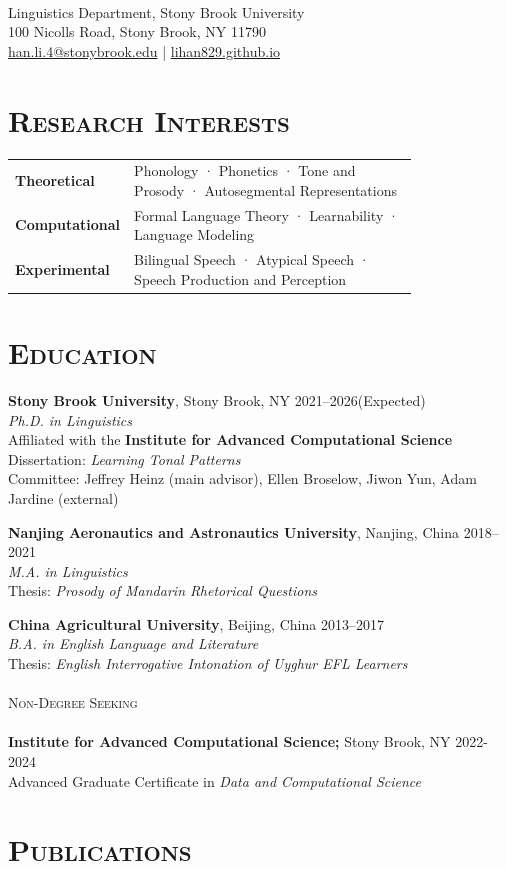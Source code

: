 \documentclass[a4paper,11pt]{article}
\newcommand{\cvsection}[1]{\section*{\Large \textsc{#1}}\vspace{-1em}}
\begin{document}
\begin{center}
    {\LARGE \textbf{}} \\[8pt] %
    Linguistics Department, Stony Brook University \\  
    100 Nicolls Road, Stony Brook, NY 11790 \\  
    \href{mailto:han.li.4@stonybrook.edu}{han.li.4@stonybrook.edu} |
    \href{http://lihan829.github.io}{lihan829.github.io}\\
\end{center}

\cvsection{Research Interests}

\begin{tabular}{@{}l p{0.8\linewidth}@{}}

\textbf{Theoretical} 
& Phonology · Phonetics · Tone and Prosody · Autosegmental Representations \\

\textbf{Computational} 
& Formal Language Theory · Learnability · Language Modeling \\

\textbf{Experimental} 
& Bilingual Speech · Atypical Speech · Speech Production and Perception \\


\end{tabular}

\cvsection{Education}
\noindent
\textbf{Stony Brook University}, Stony Brook, NY \hfill 2021–2026(Expected) \\  
\textit{Ph.D. in Linguistics} \\  
Affiliated with the \textbf{Institute for Advanced Computational Science} \\
Dissertation: \textit{Learning Tonal Patterns} \\
Committee: Jeffrey Heinz (main advisor), Ellen Broselow, Jiwon Yun, Adam Jardine (external)


\vspace{1em}\noindent
\textbf{Nanjing Aeronautics and Astronautics University}, Nanjing, China \hfill 2018–2021 \\  
\textit{M.A. in Linguistics} \\  
Thesis: \textit{Prosody of Mandarin Rhetorical Questions}  

\vspace{1em}\noindent
\textbf{China Agricultural University}, Beijing, China \hfill 2013–2017 \\  
\textit{B.A. in English Language and Literature} \\  
Thesis: \textit{English Interrogative Intonation of Uyghur EFL Learners} 
\\
\\
\noindent \textsc{Non-Degree Seeking}\\\\
\textbf{Institute for Advanced Computational Science;} Stony Brook, NY \hfill 2022-2024\\
Advanced Graduate Certificate in \textit{Data and Computational Science}
\cvsection{Publications}
\end{document}
